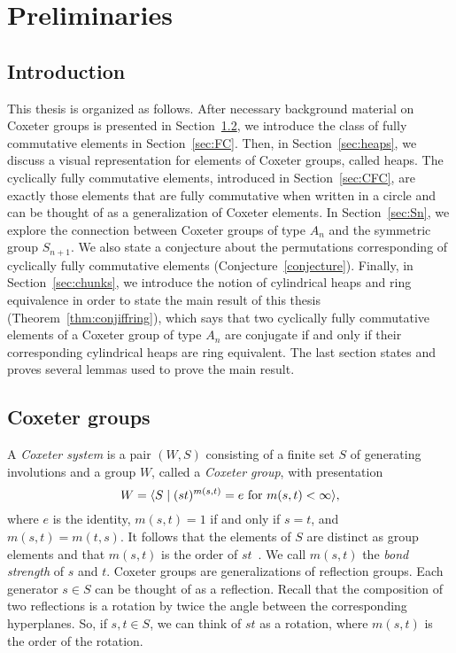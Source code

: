 \chapter{Preliminaries}

\section{Introduction}
    This thesis is organized as follows.
    After necessary background material on Coxeter groups is presented in Section~\ref{sec:coxeter}, we introduce the class of fully commutative elements in Section~\ref{sec:FC}. Then, in Section~\ref{sec:heaps}, we discuss a visual representation for  elements of Coxeter groups, called heaps.
    The cyclically fully commutative elements, introduced in Section~\ref{sec:CFC}, are exactly those elements that are fully commutative when written in a circle and can be thought of as a generalization of Coxeter elements.
    In Section~\ref{sec:Sn}, we explore the connection between Coxeter groups of type $A_n$ and the symmetric group $S_{n+1}$. We also state a conjecture about the permutations corresponding of cyclically fully commutative elements (Conjecture~\ref{conjecture}).
    Finally, in Section~\ref{sec:chunks}, we introduce the notion of cylindrical heaps and ring equivalence in order to state the main result of this thesis (Theorem~\ref{thm:conjiffring}), which says that two cyclically fully commutative elements of a Coxeter group of type $A_n$ are conjugate if and only if their corresponding cylindrical heaps are ring equivalent.
    The last section states and proves several lemmas used to prove the main result.

\section{Coxeter groups}\label{sec:coxeter}
    A \emph{Coxeter system} is a pair $(W,S)$ consisting of a finite set $S$ of generating involutions and a group $W$, called a \emph{Coxeter group}, with presentation
    $$W = \langle S \mid (st)^{m(s,t)} = e ~\text{for}~ m(s,t) < \infty  \rangle,$$
    where $e$ is the identity, $m(s,t) = 1$ if and only if $s = t$, and $m(s,t) = m(t,s)$.
    It follows that the elements of $S$ are distinct as group elements and that $m(s,t)$ is the order of $st$~\cite{Humphreys1990}.
    We call $m(s,t)$ the \emph{bond strength} of $s$ and $t$.
    Coxeter groups are generalizations of reflection groups. Each generator $s \in S$ can be thought of as a reflection. Recall that the composition of two reflections is a rotation by twice the angle between the corresponding hyperplanes. So, if $s,t \in S$, we can think of $st$ as a rotation, where $m(s,t)$ is the order of the rotation.

